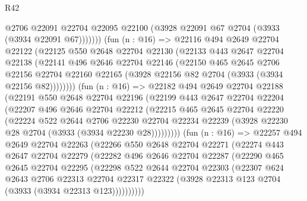 \begin{lexlean}{R42}
\begin{coremodule}
                @2706
                @22091
                @22704
                @22095
                @22100
                (@3928 @22091 @67 @2704 (@3933 (@3934 @22091 @67)))))))
        (fun (n : @16) =>
        @22116
          @494
          @2649
          @22704
          @22122
          (@22125
            @550
            @2648
            @22704
            @22130
            (@22133
              @443
              @2647
              @22704
              @22138
              (@22141
                @496
                @2646
                @22704
                @22146
                (@22150
                  @465
                  @2645
                  @2706
                  @22156
                  @22704
                  @22160
                  @22165
                  (@3928 @22156 @82 @2704 (@3933 (@3934 @22156 @82))))))))
        (fun (n : @16) =>
        @22182
          @494
          @2649
          @22704
          @22188
          (@22191
            @550
            @2648
            @22704
            @22196
            (@22199
              @443
              @2647
              @22704
              @22204
              (@22207
                @496
                @2646
                @22704
                @22212
                (@22215
                  @465
                  @2645
                  @22704
                  @22220
                  (@22224
                    @522
                    @2644
                    @2706
                    @22230
                    @22704
                    @22234
                    @22239
                    (@3928 @22230 @28 @2704 (@3933 (@3934 @22230 @28)))))))))
        (fun (n : @16) =>
        @22257
          @494
          @2649
          @22704
          @22263
          (@22266
            @550
            @2648
            @22704
            @22271
            (@22274
              @443
              @2647
              @22704
              @22279
              (@22282
                @496
                @2646
                @22704
                @22287
                (@22290
                  @465
                  @2645
                  @22704
                  @22295
                  (@22298
                    @522
                    @2644
                    @22704
                    @22303
                    (@22307
                      @624
                      @2643
                      @2706
                      @22313
                      @22704
                      @22317
                      @22322
                      (@3928 @22313 @123 @2704 (@3933 (@3934 @22313 @123))))))))))

\end{coremodule}
\end{lexlean}
